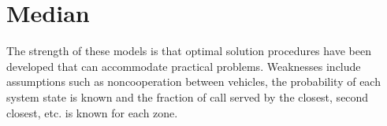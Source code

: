 \section{Median}
The strength of these models
is that optimal solution procedures
have been developed
that can accommodate practical problems.
Weaknesses include assumptions
such as noncooperation between vehicles,
the probability of each system state is known
and the fraction of call
served by the closest, second closest, etc.
is known for each zone.
